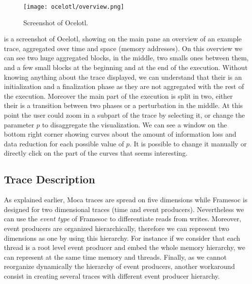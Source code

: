 \begin{figure}[htb]
    \centering
    \texttt{[image: ocelotl/overview.png]}
    \caption{Screenshot of Ocelotl.}
    \label{fig:ocelotl-overview}
\end{figure}


 is a screenshot of \gls{Ocelotl}, showing on the main pane an overview of an example trace, aggregated over time and space (memory addresses).
On this overview we can see two huge aggregated blocks, in the middle, two smalls ones between them, and a few small blocks at the beginning and at the end of the execution.
Without knowing anything about the trace displayed, we can understand that their is an initialization and a finalization phase as they are not aggregated with the rest of the execution.
Moreover the main part of the execution is split in two, either their is a transition between two phases or a perturbation in the middle.
At this point the user could zoom in a subpart of the trace by selecting it, or change the parameter $p$ to disaggregate the visualization.
We can see a window on the bottom right corner showing curves about the  amount of information loss and data reduction for each possible value of $p$.
It is possible to change it manually or directly click on the part of the curves that seems interesting.


\subsection{Trace Description}

As explained earlier, \gls{Moca} traces are spread on five dimensions while \gls{Framesoc} is designed for two dimensional traces (time and event producers).
Nevertheless we can use the \emph{event type} of \gls{Framesoc} to differentiate reads from writes.
Moreover, event producers are organized hierarchically, therefore we can represent two dimensions as one by using this hierarchy.
For instance if we consider that each thread is a root level event producer and embed the whole memory hierarchy, we can represent at the same time memory and threads.
Finally, as we cannot reorganize dynamically the hierarchy of event producers, another workaround consist in creating several traces with different event producer hierarchy.

